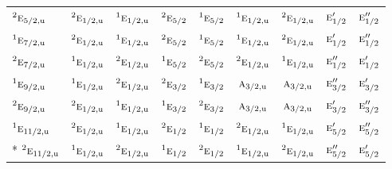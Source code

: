 \documentclass[10pt,a4paper]{article}
\numberwithin{equation}{section}
\newcommand{\irr}[1]{\text{\normalfont\scshape #1}}
\newcommand{\conjpair}[1]{{}^{#1}}
\newcommand{\ptag}[1]{\mathrm{#1}}
\begin{document}
{\begin{longtable}{@{}lcccccccc@{}}
$\conjpair{2}\irr{e}_{5/2,\ptag{u}}$ & $\conjpair{2}\irr{e}_{1/2,\ptag{u}}$ & $\conjpair{1}\irr{e}_{1/2,\ptag{u}}$ & $\conjpair{2}\irr{e}_{5/2}$ & $\conjpair{1}\irr{e}_{5/2}$ & $\conjpair{1}\irr{e}_{1/2,\ptag{u}}$ & $\conjpair{2}\irr{e}_{1/2,\ptag{u}}$ & $\irr{e}_{1/2}'$ & $\irr{e}_{1/2}''$\\
$\conjpair{1}\irr{e}_{7/2,\ptag{u}}$ & $\conjpair{2}\irr{e}_{1/2,\ptag{u}}$ & $\conjpair{1}\irr{e}_{1/2,\ptag{u}}$ & $\conjpair{2}\irr{e}_{5/2}$ & $\conjpair{1}\irr{e}_{5/2}$ & $\conjpair{1}\irr{e}_{1/2,\ptag{u}}$ & $\conjpair{2}\irr{e}_{1/2,\ptag{u}}$ & $\irr{e}_{1/2}'$ & $\irr{e}_{1/2}''$\\
$\conjpair{2}\irr{e}_{7/2,\ptag{u}}$ & $\conjpair{1}\irr{e}_{1/2,\ptag{u}}$ & $\conjpair{2}\irr{e}_{1/2,\ptag{u}}$ & $\conjpair{1}\irr{e}_{5/2}$ & $\conjpair{2}\irr{e}_{5/2}$ & $\conjpair{2}\irr{e}_{1/2,\ptag{u}}$ & $\conjpair{1}\irr{e}_{1/2,\ptag{u}}$ & $\irr{e}_{1/2}''$ & $\irr{e}_{1/2}'$\\
$\conjpair{1}\irr{e}_{9/2,\ptag{u}}$ & $\conjpair{1}\irr{e}_{1/2,\ptag{u}}$ & $\conjpair{2}\irr{e}_{1/2,\ptag{u}}$ & $\conjpair{2}\irr{e}_{3/2}$ & $\conjpair{1}\irr{e}_{3/2}$ & $\irr{a}_{3/2,\ptag{u}}$ & $\irr{a}_{3/2,\ptag{u}}$ & $\irr{e}_{3/2}''$ & $\irr{e}_{3/2}'$\\
$\conjpair{2}\irr{e}_{9/2,\ptag{u}}$ & $\conjpair{2}\irr{e}_{1/2,\ptag{u}}$ & $\conjpair{1}\irr{e}_{1/2,\ptag{u}}$ & $\conjpair{1}\irr{e}_{3/2}$ & $\conjpair{2}\irr{e}_{3/2}$ & $\irr{a}_{3/2,\ptag{u}}$ & $\irr{a}_{3/2,\ptag{u}}$ & $\irr{e}_{3/2}'$ & $\irr{e}_{3/2}''$\\
$\conjpair{1}\irr{e}_{11/2,\ptag{u}}$ & $\conjpair{2}\irr{e}_{1/2,\ptag{u}}$ & $\conjpair{1}\irr{e}_{1/2,\ptag{u}}$ & $\conjpair{2}\irr{e}_{1/2}$ & $\conjpair{1}\irr{e}_{1/2}$ & $\conjpair{2}\irr{e}_{1/2,\ptag{u}}$ & $\conjpair{1}\irr{e}_{1/2,\ptag{u}}$ & $\irr{e}_{5/2}'$ & $\irr{e}_{5/2}''$\\*
$\conjpair{2}\irr{e}_{11/2,\ptag{u}}$ & $\conjpair{1}\irr{e}_{1/2,\ptag{u}}$ & $\conjpair{2}\irr{e}_{1/2,\ptag{u}}$ & $\conjpair{1}\irr{e}_{1/2}$ & $\conjpair{2}\irr{e}_{1/2}$ & $\conjpair{1}\irr{e}_{1/2,\ptag{u}}$ & $\conjpair{2}\irr{e}_{1/2,\ptag{u}}$ & $\irr{e}_{5/2}''$ & $\irr{e}_{5/2}'$\\
\bottomrule\end{longtable}}
\end{document}
